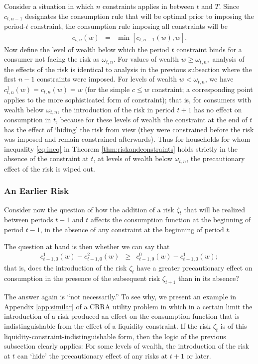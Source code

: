 \documentclass[titlepage]{\econtex}
\providecommand{\wAlt}{\omega}
\begin{document}
Consider a situation in which $n$ constraints applies in between $t$ and $T$.
Since $c_{t,n-1}$ designates the consumption rule that will be optimal prior to imposing the period-$t$ constraint, the consumption rule imposing all
constraints will be
\begin{eqnarray}
c_{t,n}(w) & = & \min[c_{t,n-1}(w),w].
\end{eqnarray}
Now define the level of wealth below which the period $t$ constraint binds for a consumer not facing the risk as ${\wAlt}_{t,n}.$ For values of wealth $w \geq {\wAlt}_{t,n},$ analysis of the effects of the risk is identical to analysis in the previous subsection where the first $n-1$ constraints were imposed. For levels of wealth $w < {\wAlt}_{t,n}$, we have $c^{1}_{t,n}(w) = c_{t,n}(w)=w$ (for the simple $c \leq w$
constraint; a corresponding point applies to the more sophisticated form of constraint); that is, for consumers with wealth below ${\wAlt}_{t,n}$, the introduction of the risk in period $t+1$ has no effect on consumption in $t$, because for these levels of wealth the constraint at the end of $t$ has the effect of `hiding' the
risk from view (they were constrained before the risk was imposed and remain constrained afterwards). Thus for households for whom inequality \eqref{eq:ineq} in Theorem \ref{thm:riskandconstraints} holds strictly in the absence of the constraint at $t$, at levels of wealth below ${\wAlt}_{t,n}$, the precautionary effect of the risk is wiped out.


\subsubsection{An Earlier Risk}\label{subsubsec:AnEarlierRisk}


Consider now the question of how the addition of a risk $\zeta_{t}$ that will be realized between periods $t-1$ and $t$ affects the consumption function at the beginning of period $t-1$, in the absence of any constraint at the beginning of period $t$.

The question at hand is then whether we can say that
\begin{eqnarray}
  \label{eq:earlierrisk}
  c_{t-1,0}^{1}(w)-c_{t-1,0}^{2}(w) & \geq & c_{t-1,0}^0(w)-c^{1}_{t-1,0}(w);
\end{eqnarray}
that is, does the introduction of the risk $\zeta_{t}$ have a greater precautionary effect on consumption in the presence of the subsequent risk $\zeta_{t+1}$ than in its absence?

The answer again is ``not necessarily.''  To see why, we present an example in Appendix \ref{app:similar} of a CRRA utility problem in which in a certain limit the introduction of a risk produced an effect on the consumption function that is indistinguishable from the effect of a liquidity constraint.  If the risk $\zeta_{t}$ is of this liquidity-constraint-indistinguishable form, then the logic of the previous subsection clearly applies: For some levels of wealth, the introduction of the risk at $t$ can `hide' the precautionary effect of any risks at $t+1$ or later.
\end{document}
